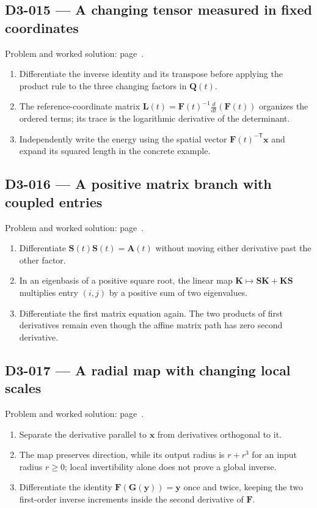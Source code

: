 \documentclass[11pt,oneside,openany]{book}
\begin{document}
\subsection*{D3-015 --- A changing tensor measured in fixed coordinates}
\label{hints:D3-015}
Problem and worked solution: page~\pageref{problem:D3-015}.

\begin{enumerate}
\item Differentiate the inverse identity and its transpose before applying the product rule to the three changing factors in \(\mathbf Q(t)\).
\item The reference-coordinate matrix \(\mathbf L(t)=\mathbf F(t)^{-1}\frac{d}{dt}(\mathbf F(t))\) organizes the ordered terms; its trace is the logarithmic derivative of the determinant.
\item Independently write the energy using the spatial vector \(\mathbf F(t)^{-\mathsf T}\mathbf x\) and expand its squared length in the concrete example.
\end{enumerate}
\subsection*{D3-016 --- A positive matrix branch with coupled entries}
\label{hints:D3-016}
Problem and worked solution: page~\pageref{problem:D3-016}.

\begin{enumerate}
\item Differentiate \(\mathbf S(t)\mathbf S(t)=\mathbf A(t)\) without moving either derivative past the other factor.
\item In an eigenbasis of a positive square root, the linear map \(\mathbf K\mapsto\mathbf S\mathbf K+\mathbf K\mathbf S\) multiplies entry \((i,j)\) by a positive sum of two eigenvalues.
\item Differentiate the first matrix equation again. The two products of first derivatives remain even though the affine matrix path has zero second derivative.
\end{enumerate}
\subsection*{D3-017 --- A radial map with changing local scales}
\label{hints:D3-017}
Problem and worked solution: page~\pageref{problem:D3-017}.

\begin{enumerate}
\item Separate the derivative parallel to \(\mathbf x\) from derivatives orthogonal to it.
\item The map preserves direction, while its output radius is \(r+r^3\) for an input radius \(r\ge0\); local invertibility alone does not prove a global inverse.
\item Differentiate the identity \(\mathbf F(\mathbf G(\mathbf y))=\mathbf y\) once and twice, keeping the two first-order inverse increments inside the second derivative of \(\mathbf F\).
\end{enumerate}
\end{document}

